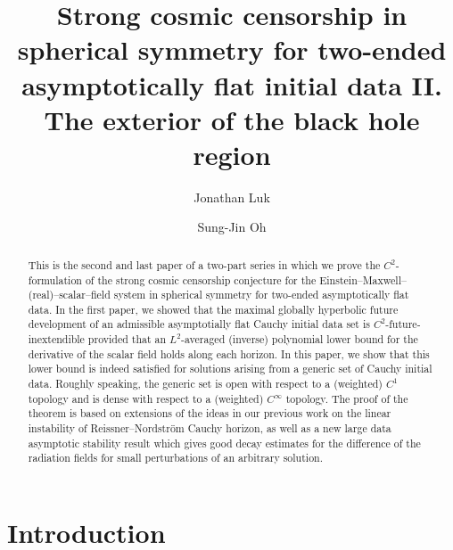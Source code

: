 \documentclass[10pt, reqno]{amsart}
\theoremstyle{definition}
\theoremstyle{remark}
\theoremstyle{conjecture}
\numberwithin{equation}{section}
\newcommand{\0}{\emptyset}
\begin{document}
\title[]{Strong cosmic censorship in spherical symmetry for two-ended asymptotically flat initial data II. The exterior of the black hole region}%
\author{Jonathan Luk}
\address{Department of Mathematics, Stanford University, Palo Alto, CA, USA}

\author{Sung-Jin Oh}
\address{Korea Institute for Advanced Study, Seoul, Korea}


\begin{abstract}
This is the second and last paper of a two-part series in which we prove the $C^2$-formulation of the strong cosmic censorship conjecture for the Einstein--Maxwell--(real)--scalar--field system in spherical symmetry for two-ended asymptotically flat data. In the first paper, we showed that the maximal globally hyperbolic future development of an admissible asymptotially flat Cauchy initial data set is $C^2$-future-inextendible provided that an $L^2$-averaged (inverse) polynomial lower bound for the derivative of the scalar field holds along each horizon. In this paper, we show that this lower bound is indeed satisfied for solutions arising from a generic set of Cauchy initial data. Roughly speaking, the generic set is open with respect to a (weighted) $C^1$ topology and is dense with respect to a (weighted) $C^\infty$ topology. The proof of the theorem is based on extensions of the ideas in our previous work on the linear instability of Reissner--Nordstr\"om Cauchy horizon, as well as a new large data asymptotic stability result which gives good decay estimates for the difference of the radiation fields for small perturbations of an arbitrary solution.
\end{abstract}

\maketitle

\tableofcontents

\section{Introduction}\label{sec.intro}
\end{document}
